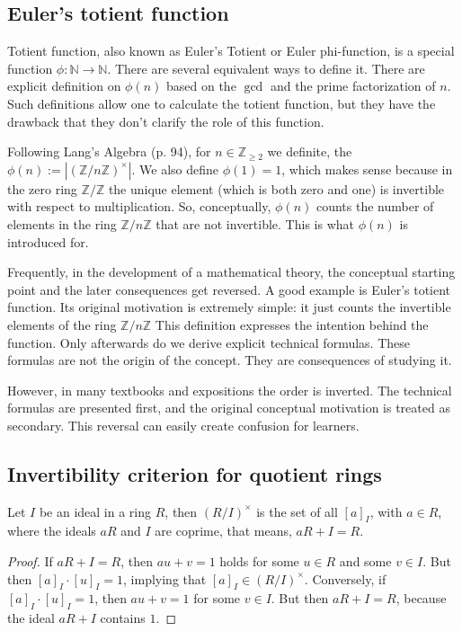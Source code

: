 \documentclass[11pt,a4paper]{amsart}
\newcommand{\Z}{{\mathbb{Z}}}
\newcommand{\N}{{\mathbb{N}}}
\begin{document}
\subsection{Euler's totient function} Totient function, also known as Euler's Totient or Euler phi-function, is a special function $\phi : \N \to \N$. There are several equivalent ways to define it. There are explicit definition on $\phi(n)$ based on the $\gcd$ and the prime factorization of $n$. Such definitions allow one to calculate the totient function, but they have the drawback that they don't clarify the role of this function. 

Following Lang's Algebra (p. 94), for  $n \in \Z_{\ge 2}$ we definite, the $\phi(n) := | (\Z / n \Z)^\times |$. We also define $\phi(1)=1$, which makes sense because in the zero ring $ \Z / \Z$ the unique element (which is both zero and one) is invertible with respect to multiplication. So, conceptually, $\phi(n)$ counts the number of elements in the ring $\Z / n \Z$ that are not invertible. This is what $\phi(n)$ is introduced for.  

Frequently, in the development of a mathematical theory, the conceptual starting point and the later consequences get reversed. A good example is Euler’s totient function. Its original motivation is extremely simple: it just counts the invertible elements of the ring 
$\Z/ n \Z$
 This definition expresses the intention behind the function. Only afterwards do we derive explicit technical formulas. These formulas are not the origin of the concept. They are consequences of studying it.

However, in many textbooks and expositions the order is inverted. The technical formulas are presented first, and the original conceptual motivation is treated as secondary. This reversal can easily create confusion for learners.

\subsection{Invertibility criterion for quotient rings} Let $I$ be an ideal in a ring $R$, then $(R / I )^\times$ is the set of all $[a]_I$, with $a \in R$, where the ideals $a R$ and $I$ are coprime, that means, $a R + I = R$. 
\begin{proof} 
	If $a R + I = R$, then $a u + v=1$ holds for some $u \in R$ and some $v \in I$. But then $[a]_I \cdot [u]_I = 1$, implying that $[a]_I \in (R / I)^\times$. Conversely, if $[a]_I \cdot [u]_I =1$, then $a u + v =1$ for some $v \in I$. But then $a R + I = R$, because the ideal $a R + I$ contains $1$. 
\end{proof} 
\end{document}
